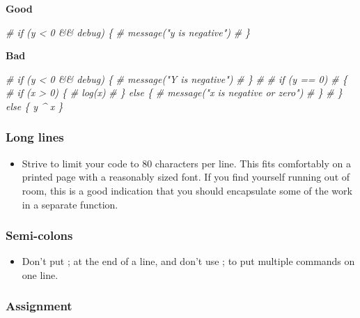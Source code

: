 \documentclass[
]{article}
\newenvironment{Shaded}{\begin{snugshade}}{\end{snugshade}}
\newcommand{\CommentTok}[1]{\textcolor[rgb]{0.56,0.35,0.01}{\textit{#1}}}
\providecommand{\tightlist}{%
  \setlength{\itemsep}{0pt}\setlength{\parskip}{0pt}}
\begin{document}
\textbf{Good}

\begin{Shaded}
\begin{Highlighting}[]
\CommentTok{# if (y < 0 && debug) \{}
\CommentTok{#   message("y is negative")}
\CommentTok{# \}}
\end{Highlighting}
\end{Shaded}

\textbf{Bad}

\begin{Shaded}
\begin{Highlighting}[]
\CommentTok{# if (y < 0 && debug) \{}
\CommentTok{# message("Y is negative")}
\CommentTok{# \}}
\CommentTok{# }
\CommentTok{# if (y == 0)}
\CommentTok{# \{}
\CommentTok{#     if (x > 0) \{}
\CommentTok{#       log(x)}
\CommentTok{#     \} else \{}
\CommentTok{#   message("x is negative or zero")}
\CommentTok{#     \}}
\CommentTok{# \} else \{ y ^ x \}}
\end{Highlighting}
\end{Shaded}

\hypertarget{long-lines}{%
\subsubsection{Long lines}\label{long-lines}}

\begin{itemize}
\tightlist
\item
  Strive to limit your code to 80 characters per line. This fits
  comfortably on a printed page with a reasonably sized font. If you
  find yourself running out of room, this is a good indication that you
  should encapsulate some of the work in a separate function.
\end{itemize}

\hypertarget{semi-colons}{%
\subsubsection{Semi-colons}\label{semi-colons}}

\begin{itemize}
\tightlist
\item
  Don't put ; at the end of a line, and don't use ; to put multiple
  commands on one line.
\end{itemize}

\hypertarget{assignment}{%
\subsubsection{Assignment}\label{assignment}}
\end{document}
